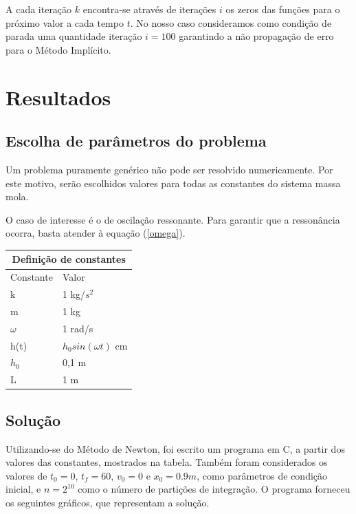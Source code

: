 \documentclass[12pt,fleqn]{article}
\begin{document}
A cada iteração $k$ encontra-se através de iterações $i$ os zeros das funções para o próximo valor a cada tempo $t$.
No nosso caso consideramos como condição de parada uma quantidade iteração $i=100$ garantindo a não propagação de erro para o Método Implícito.

\section{Resultados}
\subsection{Escolha de parâmetros do problema}
Um problema puramente genérico não pode ser resolvido numericamente. Por este motivo, serão escolhidos valores para todas as constantes do sistema massa mola.
\par
O caso de interesse é o de oscilação ressonante. Para garantir que a ressonância ocorra, basta atender à equação (\ref{omega}).
\par
    \begin{tabular}{|p{3cm}|p{3cm}|}
        \hline
        \multicolumn{2}{|c|}{Definição de constantes}\\
        \hline
        Constante & Valor\\
        \hline
        k & 1 kg/$s^{2}$  \\
        \hline
        m & 1 kg\\
        \hline
        $\omega$ & 1 rad/s\\
        \hline
        h(t) & $h_{0}sin(\omega t)$ cm\\
        \hline
        $h_{0}$ & 0,1 m\\
        \hline
        L & 1 m\\
        \hline
    \end{tabular}


\subsection{Solução}

Utilizando-se do Método de Newton, foi escrito um programa em C, a partir dos valores das constantes, mostrados na tabela. Também foram considerados os valores de $t_{0}=0$, $t_{f}=60$, $v_{0}=0$ e $x_{0}=0.9m$, como parâmetros de condição inicial, e $n = 2^{10}$ como o número de partições de integração. O programa forneceu os seguintes gráficos, que representam a solução.
\par
\end{document}
